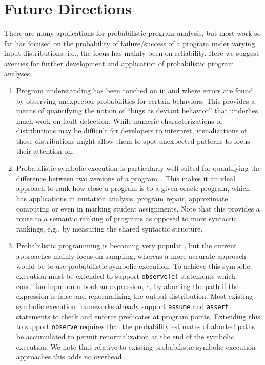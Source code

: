 \section{Future Directions}
\label{sec:future}

There are many applications for probabilistic program analysis, but most work so far has focused on the probability of failure/success of a program under varying input distributions; i.e., the focus has mainly been on reliability.
Here we suggest avenues for further development and application of
probabilistic program analyses.

\begin{enumerate}

\item Program understanding has been touched on in \cite{Geldenhuys2012} and \cite{Filieri2015} where errors are found by observing unexpected probabilities for certain behaviors.  This provides a means of quantifying the notion of ``bugs as deviant behavior'' that underlies much work on fault detection.   While numeric characterizations of distributions may be difficult for developers to interpret, visualizations of those distributions might allow them to spot unexpected patterns to focus their attention on.

\item Probabilistic symbolic execution is particularly well suited for quantifying the difference between two versions of a program~\cite{Filieri2015b}. This makes it an ideal approach to rank how close a program is to a given oracle program, which has applications in mutation analysis, program repair, approximate computing or even in marking student assignments.  Note that this provides a route to a semantic ranking of programs as opposed to more syntactic rankings, e.g., by measuring the shared syntactic structure. 

\item Probabilistic programming is becoming very popular \cite{Gordon2014}, but the current approaches mainly focus on sampling, whereas a more accurate approach would be to use probabilistic symbolic execution.  
To achieve this symbolic execution must be extended to support
\texttt{observe(e)} statements which condition input on a boolean expression,
$e$, by aborting the path if the expression is false and renormalizing the
output distribution.
Most existing symbolic execution frameworks already support \texttt{assume} and \texttt{assert} statements to check and enforce predicates at program points.
Extending this to support \texttt{observe} requires that the probability
estimates of aborted paths be accumulated to permit renormalization at the
end of the symbolic execution.  We note that relative to existing probabilistic
symbolic execution approaches this adds no overhead.


\end{enumerate}
